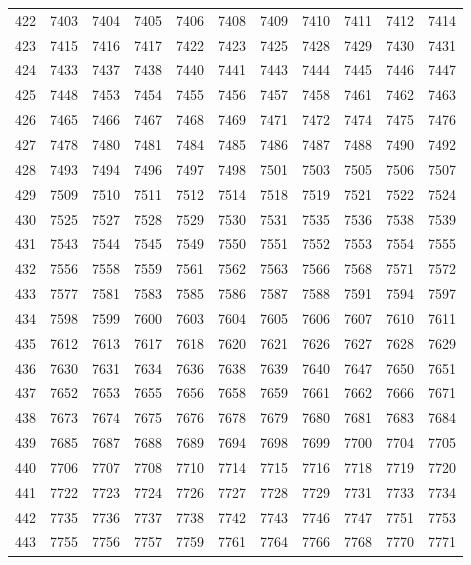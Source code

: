 \begin{longtable}{|r|rrrrrrrrrr|}
  422 & 7403 & 7404 & 7405 & 7406 & 7408 & 7409 & 7410 & 7411 & 7412 & 7414 \\ 
  423 & 7415 & 7416 & 7417 & 7422 & 7423 & 7425 & 7428 & 7429 & 7430 & 7431 \\ 
  424 & 7433 & 7437 & 7438 & 7440 & 7441 & 7443 & 7444 & 7445 & 7446 & 7447 \\ 
  425 & 7448 & 7453 & 7454 & 7455 & 7456 & 7457 & 7458 & 7461 & 7462 & 7463 \\ 
  426 & 7465 & 7466 & 7467 & 7468 & 7469 & 7471 & 7472 & 7474 & 7475 & 7476 \\ 
  427 & 7478 & 7480 & 7481 & 7484 & 7485 & 7486 & 7487 & 7488 & 7490 & 7492 \\ 
  428 & 7493 & 7494 & 7496 & 7497 & 7498 & 7501 & 7503 & 7505 & 7506 & 7507 \\ 
  429 & 7509 & 7510 & 7511 & 7512 & 7514 & 7518 & 7519 & 7521 & 7522 & 7524 \\ 
  430 & 7525 & 7527 & 7528 & 7529 & 7530 & 7531 & 7535 & 7536 & 7538 & 7539 \\ 
  431 & 7543 & 7544 & 7545 & 7549 & 7550 & 7551 & 7552 & 7553 & 7554 & 7555 \\ 
  432 & 7556 & 7558 & 7559 & 7561 & 7562 & 7563 & 7566 & 7568 & 7571 & 7572 \\ 
  433 & 7577 & 7581 & 7583 & 7585 & 7586 & 7587 & 7588 & 7591 & 7594 & 7597 \\ 
  434 & 7598 & 7599 & 7600 & 7603 & 7604 & 7605 & 7606 & 7607 & 7610 & 7611 \\ 
  435 & 7612 & 7613 & 7617 & 7618 & 7620 & 7621 & 7626 & 7627 & 7628 & 7629 \\ 
  436 & 7630 & 7631 & 7634 & 7636 & 7638 & 7639 & 7640 & 7647 & 7650 & 7651 \\ 
  437 & 7652 & 7653 & 7655 & 7656 & 7658 & 7659 & 7661 & 7662 & 7666 & 7671 \\ 
  438 & 7673 & 7674 & 7675 & 7676 & 7678 & 7679 & 7680 & 7681 & 7683 & 7684 \\ 
  439 & 7685 & 7687 & 7688 & 7689 & 7694 & 7698 & 7699 & 7700 & 7704 & 7705 \\ 
  440 & 7706 & 7707 & 7708 & 7710 & 7714 & 7715 & 7716 & 7718 & 7719 & 7720 \\ 
  441 & 7722 & 7723 & 7724 & 7726 & 7727 & 7728 & 7729 & 7731 & 7733 & 7734 \\ 
  442 & 7735 & 7736 & 7737 & 7738 & 7742 & 7743 & 7746 & 7747 & 7751 & 7753 \\ 
  443 & 7755 & 7756 & 7757 & 7759 & 7761 & 7764 & 7766 & 7768 & 7770 & 7771 \\ 

\end{longtable}
